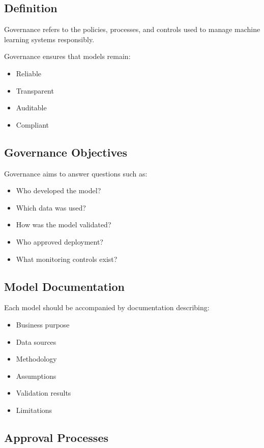 \subsection{Definition}

Governance refers to the policies, processes, and controls used to manage machine learning systems responsibly.

Governance ensures that models remain:

\begin{itemize}
    \item Reliable
    \item Transparent
    \item Auditable
    \item Compliant
\end{itemize}

\subsection{Governance Objectives}

Governance aims to answer questions such as:

\begin{itemize}
    \item Who developed the model?
    \item Which data was used?
    \item How was the model validated?
    \item Who approved deployment?
    \item What monitoring controls exist?
\end{itemize}

\subsection{Model Documentation}

Each model should be accompanied by documentation describing:

\begin{itemize}
    \item Business purpose
    \item Data sources
    \item Methodology
    \item Assumptions
    \item Validation results
    \item Limitations
\end{itemize}

\subsection{Approval Processes}

